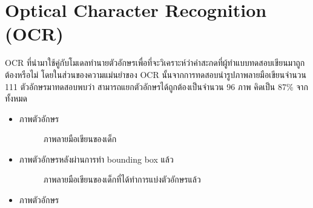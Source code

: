 \documentclass[12pt,oneside,openright,a4paper]{cpe-thai-project}
\begin{document}
\section{Optical Character Recognition (OCR) }
  OCR ที่นำมาใช้คู่กับโมเดลทำนายตัวอักษรเพื่อที่จะวิเคราะห์ว่าคำสะกดที่ผู้ทำแบบทดสอบเขียนมาถูกต้องหรือไม่ โดยในส่วนของความแม่นยำของ OCR นั้นจากการทดสอบนำรูปภาพลายมือเขียนจำนวน 111 ตัวอักษรมาทดสอบพบว่า สามารถแยกตัวอักษรได้ถูกต้องเป็นจำนวน 96 ภาพ คิดเป็น 87\% จากทั้งหมด
\begin{itemize}
  \item ภาพตัวอักษร
  \begin{figure}[!h]\centering
    \setlength{\fboxrule}{0.2mm} %
    \setlength{\fboxsep}{1cm}
    \caption{ภาพลายมือเขียนของเด็ก}\label{fig:system}                  
   \end{figure}
   \item ภาพตัวอักษรหลังผ่านการทำ bounding box แล้ว
   \begin{figure}[!h]\centering
     \setlength{\fboxrule}{0.2mm} %
     \setlength{\fboxsep}{1cm}
     \caption{ภาพลายมือเขียนของเด็กที่ได้ทำการแบ่งตัวอักษรแล้ว}\label{fig:system}                  
    \end{figure}
    \newpage
    \item ภาพตัวอักษร
  \begin{figure}[!h]\centering

\end{figure}
\end{itemize}
\end{document}
